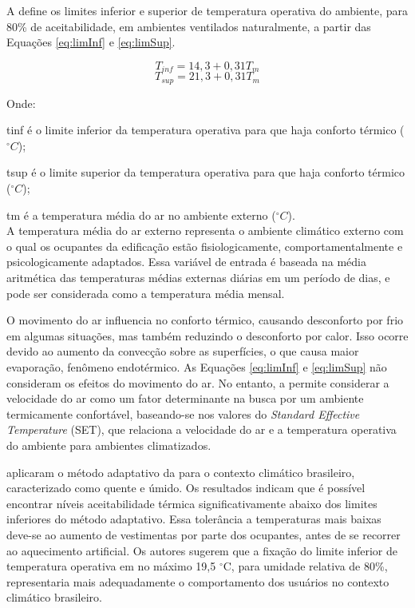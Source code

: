 \documentclass[brazil,hardcopy,openany]{ufscthesis} %
\begin{document}
A  define os limites inferior e superior de temperatura operativa do ambiente, para 80\% de aceitabilidade, em ambientes ventilados naturalmente, a partir das Equações \ref{eq:limInf} e \ref{eq:limSup}.

\begin{equation}\label{eq:limInf}
T_{inf} = 14,3 + 0,31 T_m
\end{equation}
\begin{equation}\label{eq:limSup}
T_{sup} = 21,3 + 0,31 T_m
\end{equation}

Onde:

\gls{tinf} é o limite inferior da temperatura operativa para que haja conforto térmico ($^{\circ}C$);

\gls{tsup} é o limite superior da temperatura operativa para que haja conforto térmico ($^{\circ}C$);

\gls{tm} é a temperatura média do ar no ambiente externo ($^{\circ}C$).
\\

A temperatura média do ar externo representa o ambiente climático externo com o qual os ocupantes da edificação estão fisiologicamente,
comportamentalmente e psicologicamente adaptados. Essa variável de entrada é baseada na média aritmética das temperaturas médias externas diárias em um período de dias, e pode ser considerada como a temperatura média mensal.

O movimento do ar influencia no conforto térmico, causando desconforto por frio em algumas situações, mas também reduzindo o desconforto por calor.
Isso ocorre devido ao aumento da convecção sobre as superfícies, o que causa maior evaporação, fenômeno endotérmico. As Equações \ref{eq:limInf} e \ref{eq:limSup} não consideram os efeitos do movimento do ar. No entanto, a  permite considerar a velocidade do ar como um fator determinante na busca por um ambiente termicamente confortável, baseando-se nos valores do  \textit{Standard Effective Temperature} (SET), que relaciona a velocidade do ar e a temperatura operativa do ambiente para ambientes climatizados.

 aplicaram o método adaptativo da  para o contexto climático brasileiro, caracterizado como quente e úmido. Os resultados indicam que é possível encontrar níveis aceitabilidade térmica significativamente abaixo dos limites inferiores do método adaptativo. Essa tolerância a temperaturas mais baixas deve-se ao aumento de vestimentas por parte dos ocupantes, antes de se recorrer ao aquecimento artificial. Os autores sugerem que a fixação do limite inferior de temperatura operativa em no máximo 19,5 $^{\circ}$C, para umidade relativa de 80\%, representaria mais adequadamente o comportamento dos usuários no contexto climático brasileiro.
\end{document}
